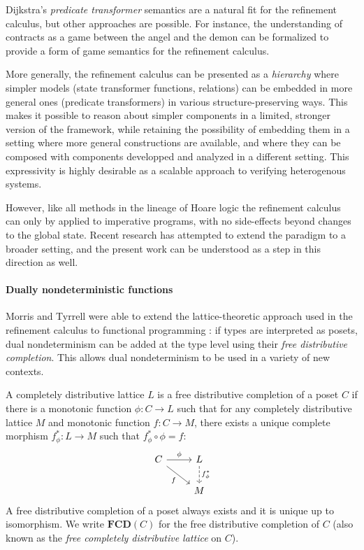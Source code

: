 \documentclass[format=sigplan,authordraft]{acmart}
\begin{document}
Dijkstra's \emph{predicate transformer} semantics \cite{gc}
are a natural fit for the refinement calculus,
but other approaches are possible.
For instance,
the understanding of contracts as a game between
the angel and the demon
can be formalized to provide a form of
game semantics for the refinement calculus.

More generally,
the refinement calculus can be presented as a \emph{hierarchy}
where simpler models (state transformer functions, relations)
can be embedded in more general ones (predicate transformers)
in various structure-preserving ways.
This makes it possible to reason about simpler components
in a limited, stronger version of the framework,
while retaining the possibility of embedding them
in a setting
where more general constructions are available,
and where they can be composed with components
developped and analyzed in a different setting.
This expressivity is highly desirable
as a scalable approach to
verifying heterogenous systems.

However,
like all methods in the lineage of Hoare logic
the refinement calculus can only by applied to imperative programs,
with no side-effects beyond changes to the global state.
Recent research has attempted to extend the paradigm
to a broader setting,
and the present work can be understood
as a step in this direction as well.


\paragraph{Dually nondeterministic functions} %

Morris and Tyrrell were able to extend
the lattice-theoretic approach used in the refinement calculus
to functional programming
\cite{augtyp,dndf,cspdnd}:
if types are interpreted as posets,
dual nondeterminism can be added at the type level
using their \emph{free distributive completion}.
This allows dual nondeterminism to be used
in a variety of new contexts.

A completely distributive lattice $L$ is a
free distributive completion of
a poset $C$ if there is
a monotonic function $\phi : C \rightarrow L$
such that
for any completely distributive lattice $M$
and monotonic function $f : C \rightarrow M$,
there exists a unique complete morphism $f^*_\phi : L \rightarrow M$
such that $f^*_\phi \circ \phi = f$:
\[
  \begin{tikzcd}
    C \arrow[r, "\phi"] \arrow[rd, "f"'] &
    L \arrow[d, "f^*_\phi", dashed] \\ & M
  \end{tikzcd}
\]
A free distributive completion of a poset
always exists and it is unique up to isomorphism.
We write $\mathbf{FCD}(C)$ for
the free distributive completion of $C$
(also known as the \emph{free completely distributive lattice} on $C$).
\end{document}
